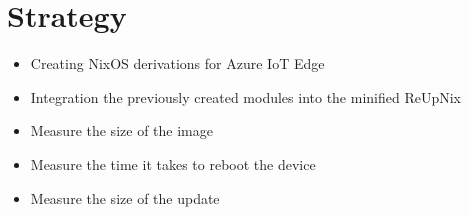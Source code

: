 \section{Strategy}
\begin{tcolorbox}[title=TODO]
    \begin{itemize}
    \item Creating NixOS derivations for Azure IoT Edge
    \item Integration the previously created modules into the minified ReUpNix
    \item Measure the size of the image
    \item Measure the time it takes to reboot the device
    \item Measure the size of the update
    \end{itemize}
\end{tcolorbox}

